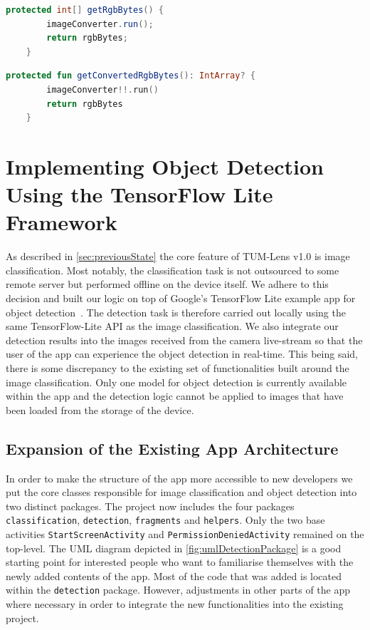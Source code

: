 \documentclass[
			   fontsize=11pt,
               paper=a4,
               bibliography=totoc,
               idxtotoc,
               headsepline,
               footsepline,
               footinclude=false,
               BCOR=12mm,
               DIV=13,
               openany,   %
               ]
               {scrbook}
\newcommand{\code}[1]{\lstinline[basicstyle = \ttfamily\small]{#1}} %
\begin{document}
\begin{lstlisting}[style=standard, language=Java, label=code:bugSourceJava, caption={Java code that lead to the introduction of a bug after using Android Studio's built-in Java to Kotlin conversion command. The bug was created when this code block was substituted with a default getter in Kotlin ommiting parts of its logic.}]
	protected int[] getRgbBytes() {
		imageConverter.run();
		return rgbBytes;
	}
\end{lstlisting}

\begin{lstlisting}[style=standard, language=Kotlin, label=code:bugSolutionKotlin, caption={Complementing the default Kotlin getter with this method solved the problem.}]
	protected fun getConvertedRgbBytes(): IntArray? {
		imageConverter!!.run()
		return rgbBytes
	}
\end{lstlisting}

\chapter{Implementing Object Detection Using the TensorFlow Lite Framework}

As described in \autoref{sec:previousState} the core feature of TUM-Lens v1.0 is image classification. Most notably, the classification task is not outsourced to some remote server but performed offline on the device itself. We adhere to this decision and built our logic on top of Google's TensorFlow Lite example app for object detection~\cite{tfSampleAppGuide, tfSampleAppRepo}. The detection task is therefore carried out locally using the same TensorFlow-Lite API as the image classification. We also integrate our detection results into the images received from the camera live-stream so that the user of the app can experience the object detection in real-time. This being said, there is some discrepancy to the existing set of functionalities built around the image classification. Only one model for object detection is currently available within the app and the detection logic cannot be applied to images that have been loaded from the storage of the device.

\section{Expansion of the Existing App Architecture}

In order to make the structure of the app more accessible to new developers we put the core classes responsible for image classification and object detection into two distinct packages. The project now includes the four packages \code{classification}, \code{detection}, \code{fragments} and \code{helpers}. Only the two base activities \code{StartScreenActivity} and \code{PermissionDeniedActivity} remained on the top-level. The UML diagram depicted in \autoref{fig:umlDetectionPackage} is a good starting point for interested people who want to familiarise themselves with the newly added contents of the app. Most of the code that was added is located within the \code{detection} package. However, adjustments in other parts of the app where necessary in order to integrate the new functionalities into the existing project.
\end{document}
